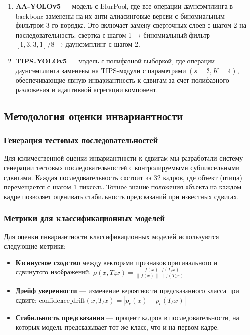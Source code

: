 \begin{enumerate}
    \item \textbf{AA-YOLOv5} — модель с BlurPool, где все операции даунсэмплинга в backbone заменены на их анти-алиасинговые версии с биномиальным фильтром 3-го порядка. Это включает замену сверточных слоев с шагом 2 на последовательность: свертка с шагом 1 → биномиальный фильтр $[1, 3, 3, 1]/8$ → даунсэмплинг с шагом 2.
    
    \item \textbf{TIPS-YOLOv5} — модель с полифазной выборкой, где операции даунсэмплинга заменены на TIPS-модули с параметрами $(s=2, K=4)$, обеспечивающие явную инвариантность к сдвигам за счет полифазного разложения и адаптивной агрегации компонент.
\end{enumerate}

\subsection{Методология оценки инвариантности}
\label{sec:evaluation}

\subsubsection{Генерация тестовых последовательностей}
\label{sec:evaluation:sequences}

Для количественной оценки инвариантности к сдвигам мы разработали систему генерации тестовых последовательностей с контролируемыми субпиксельными сдвигами. Каждая последовательность состоит из 32 кадров, где объект (птица) перемещается с шагом 1 пиксель. Точное знание положения объекта на каждом кадре позволяет оценивать стабильность предсказаний при известных сдвигах.

\subsubsection{Метрики для классификационных моделей}
\label{sec:evaluation:classification}

Для оценки инвариантности классификационных моделей используются следующие метрики:

\begin{itemize}
    \item \textbf{Косинусное сходство} между векторами признаков оригинального и сдвинутого изображений:
    $\rho(x, T_{\delta}x) = \frac{f(x) \cdot f(T_{\delta}x)}{\|f(x)\| \cdot \|f(T_{\delta}x)\|}$
    
    \item \textbf{Дрейф уверенности} — изменение вероятности предсказанного класса при сдвиге:
    $\text{confidence\_drift}(x, T_{\delta}x) = |p_c(x) - p_c(T_{\delta}x)|$
    
    \item \textbf{Стабильность предсказания} — процент кадров в последовательности, на которых модель предсказывает тот же класс, что и на первом кадре.
\end{itemize}

